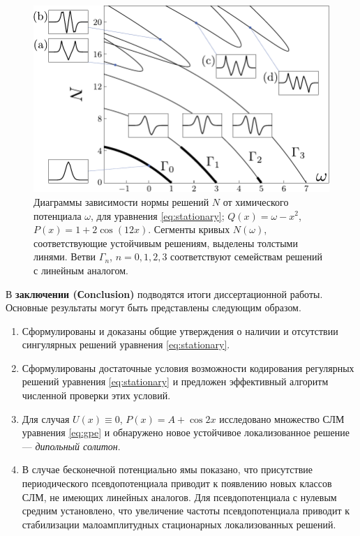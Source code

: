 \documentclass[candidate, href, colorlinks]{disser}
\begin{document}
\begin{figure}[h]
\centering
	\includegraphics[scale = 1]{pic/branches}
	\caption{
		Диаграммы зависимости нормы решений $N$ от химического потенциала $\omega$, для уравнения \eqref{eq:stationary}; $Q(x) = \omega - x^2$, $P(x) = 1 + 2 \cos (12 x)$.
		Сегменты кривых $N(\omega)$, соответствующие устойчивым решениям, выделены толстыми линями.
		Ветви $\Gamma_n$, $n = 0, 1, 2, 3$ соответствуют семействам решений с линейным аналогом.
	}
\label{fig:branches}
\end{figure}


В \textbf{заключении (Сonclusion)} подводятся итоги диссертационной работы.
Основные результаты могут быть представлены следующим образом.
\begin{enumerate}
	\item Сформулированы и доказаны общие утверждения о наличии и отсутствии сингулярных решений уравнения \eqref{eq:stationary}.
	\item Сформулированы достаточные условия возможности кодирования регулярных решений уравнения \eqref{eq:stationary} и предложен эффективный алгоритм численной проверки этих условий.
	\item Для случая $U(x) \equiv 0$, $P(x) = A + \cos 2x$ исследовано множество СЛМ уравнения \eqref{eq:gpe} и обнаружено новое устойчивое локализованное решение --- {\it дипольный солитон}.
	\item В случае бесконечной потенциально ямы показано, что присутствие периодического псевдопотенциала приводит к появлению новых классов СЛМ, не имеющих линейных аналогов.
		Для псевдопотенциала с нулевым средним установлено, что увеличение частоты псевдопотенциала приводит к стабилизации малоамплитудных стационарных локализованных решений.
\end{enumerate}
\end{document}
